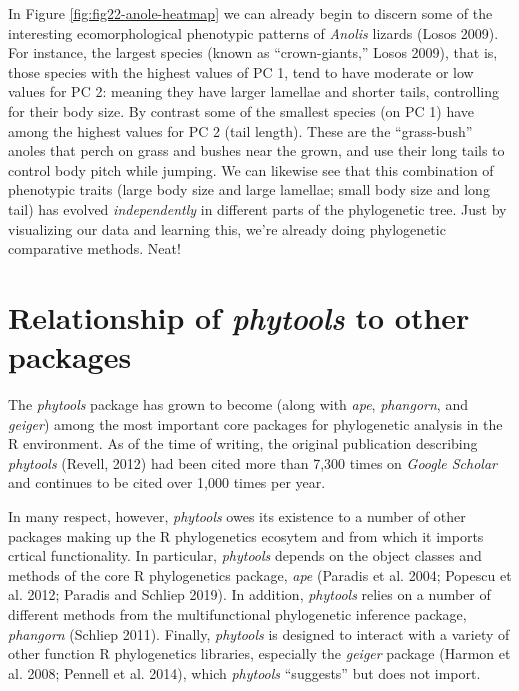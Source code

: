 \documentclass[fleqn,10pt,lineno]{wlpeerj} %
\begin{document}
In Figure \ref{fig:fig22-anole-heatmap} we can already begin to discern some of the interesting ecomorphological phenotypic patterns of \emph{Anolis} lizards (Losos 2009). For instance, the largest species (known as ``crown-giants,'' Losos 2009), that is, those species with the highest values of PC 1, tend to have moderate or low values for PC 2: meaning they have larger lamellae and shorter tails, controlling for their body size. By contrast some of the smallest species (on PC 1) have among the highest values for PC 2 (tail length). These are the ``grass-bush'' anoles that perch on grass and bushes near the grown, and use their long tails to control body pitch while jumping. We can likewise see that this combination of phenotypic traits (large body size and large lamellae; small body size and long tail) has evolved \emph{independently} in different parts of the phylogenetic tree. Just by visualizing our data and learning this, we're already doing phylogenetic comparative methods. Neat!

\hypertarget{relationship-of-phytools-to-other-packages}{%
\section{\texorpdfstring{Relationship of \emph{phytools} to other packages}{Relationship of phytools to other packages}}\label{relationship-of-phytools-to-other-packages}}

The \emph{phytools} package has grown to become (along with \emph{ape}, \emph{phangorn}, and \emph{geiger}) among the most important core packages for phylogenetic analysis in the R environment. As of the time of writing, the original publication describing \emph{phytools} (Revell, 2012) had been cited more than 7,300 times on \emph{Google Scholar} and continues to be cited over 1,000 times per year.

In many respect, however, \emph{phytools} owes its existence to a number of other packages making up the R phylogenetics ecosytem and from which it imports crtical functionality. In particular, \emph{phytools} depends on the object classes and methods of the core R phylogenetics package, \emph{ape} (Paradis et al. 2004; Popescu et al. 2012; Paradis and Schliep 2019). In addition, \emph{phytools} relies on a number of different methods from the multifunctional phylogenetic inference package, \emph{phangorn} (Schliep 2011). Finally, \emph{phytools} is designed to interact with a variety of other function R phylogenetics libraries, especially the \emph{geiger} package (Harmon et al. 2008; Pennell et al. 2014), which \emph{phytools} ``suggests'' but does not import.
\end{document}
